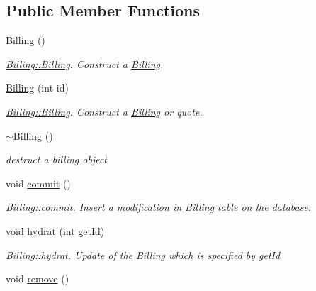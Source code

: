 \subsection*{Public Member Functions}
\begin{DoxyCompactItemize}
\item 
\hypertarget{classBilling_a8e7a38f9ef550c20ce1bf6b46153defa}{\hyperlink{classBilling_a8e7a38f9ef550c20ce1bf6b46153defa}{Billing} ()}\label{classBilling_a8e7a38f9ef550c20ce1bf6b46153defa}

\begin{DoxyCompactList}\small\item\em \hyperlink{classBilling_a8e7a38f9ef550c20ce1bf6b46153defa}{Billing\+::\+Billing}. Construct a \hyperlink{classBilling}{Billing}. \end{DoxyCompactList}\item 
\hyperlink{classBilling_a245bc864001fd8fc852697301075381d}{Billing} (int id)
\begin{DoxyCompactList}\small\item\em \hyperlink{classBilling_a8e7a38f9ef550c20ce1bf6b46153defa}{Billing\+::\+Billing}. Construct a \hyperlink{classBilling}{Billing} or quote. \end{DoxyCompactList}\item 
\hypertarget{classBilling_a93b0a1aca44baf088a424a1691d14e15}{\hyperlink{classBilling_a93b0a1aca44baf088a424a1691d14e15}{$\sim$\+Billing} ()}\label{classBilling_a93b0a1aca44baf088a424a1691d14e15}

\begin{DoxyCompactList}\small\item\em destruct a billing object \end{DoxyCompactList}\item 
\hypertarget{classBilling_a3d96a6baed6ca2d2e1096496f0fd3270}{void \hyperlink{classBilling_a3d96a6baed6ca2d2e1096496f0fd3270}{commit} ()}\label{classBilling_a3d96a6baed6ca2d2e1096496f0fd3270}

\begin{DoxyCompactList}\small\item\em \hyperlink{classBilling_a3d96a6baed6ca2d2e1096496f0fd3270}{Billing\+::commit}. Insert a modification in \hyperlink{classBilling}{Billing} table on the database. \end{DoxyCompactList}\item 
void \hyperlink{classBilling_a8beb72061cd53a964cf0ba3f04686613}{hydrat} (int \hyperlink{classIDatabaseModel_a61523b015ec148d4e68ee8054c2ad3e3}{get\+Id})
\begin{DoxyCompactList}\small\item\em \hyperlink{classBilling_a8beb72061cd53a964cf0ba3f04686613}{Billing\+::hydrat}. Update of the \hyperlink{classBilling}{Billing} which is specified by {\itshape get\+Id} \end{DoxyCompactList}\item 
\hypertarget{classBilling_ab5efe0286d292707073b9f1cecd98d6f}{void \hyperlink{classBilling_ab5efe0286d292707073b9f1cecd98d6f}{remove} ()}\label{classBilling_ab5efe0286d292707073b9f1cecd98d6f}


\end{DoxyCompactItemize}
